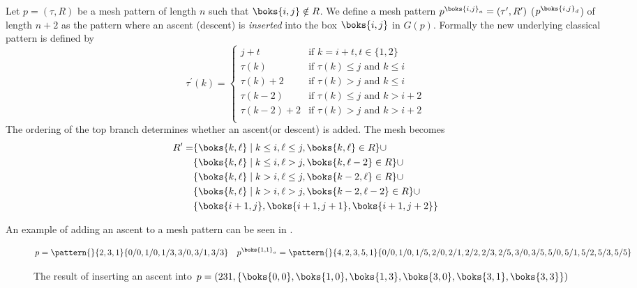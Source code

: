 \begin{definition}
Let \(p=(\tau,R)\) be a mesh pattern of length \(n\) such that \(\boks{i,j}\notin R\). We define
a mesh pattern \(p^{\boks{i,j}_a} = (\tau^\prime,R^\prime)\) (\(p^{\boks{i,j}_d}\)) of length \(n+2\)
as the pattern where an ascent (descent) is \emph{inserted} into the box \(\boks{i,j}\) in \(G(p)\).
Formally the new underlying classical pattern is defined by
\begin{equation*}
\tau^\prime(k) = \begin{cases}
    j+t & \text{if } k = i+t,t\in\{1,2\}\\
    \tau(k) & \text{if } \tau(k)\le j \text{ and }k\le i\\
    \tau(k)+2 & \text{if } \tau(k)> j \text{ and }k\le i\\
    \tau(k-2) & \text{if } \tau(k)\le j \text{ and }k> i+2\\
    \tau(k-2)+2 & \text{if } \tau(k)> j \text{ and }k> i+2\\
\end{cases}
\end{equation*}
The ordering of the top branch determines whether an ascent(or descent) is added.
The mesh becomes
\begin{equation*}
\begin{aligned}
R^\prime=&\{\boks{k,\ell}\mid k\le i, \ell\le j, \boks{k,\ell}\in R\} \cup\\
&\{\boks{k,\ell}\mid k\le i, \ell > j, \boks{k,\ell-2}\in R\}\cup\\
&\{\boks{k,\ell}\mid k > i, \ell \le j, \boks{k-2,\ell}\in R\}\cup\\
&\{\boks{k,\ell}\mid k > i, \ell > j, \boks{k-2,\ell-2}\in R\}\cup\\
&\{\boks{i+1,j},\boks{i+1,j+1},\boks{i+1,j+2}\}
\end{aligned}
\end{equation*}
\end{definition}
An example of adding an ascent to a mesh pattern can be seen in .
\begin{figure}
\begin{equation*}
p = \pattern{}{2,3,1}{0/0,1/0,1/3,
                      3/0,3/1,3/3} \quad
p^{\boks{1,1}_a}= \pattern{}{4,2,3,5,1}{0/0,
                        1/0,1/5,
                        2/0,2/1,2/2,2/3,2/5,
                        3/0,3/5,
                        5/0,5/1,5/2,5/3,5/5}
\end{equation*}
\caption{The result of inserting an ascent into \(p=(231,\{\boks{0,0},\boks{1,0},\boks{1,3},\boks{3,0},\boks{3,1},\boks{3,3}\})\)}
\label{fig:adda}
\end{figure}

